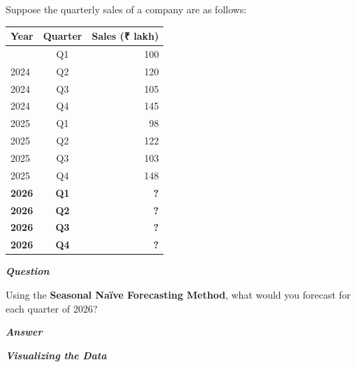 \documentclass[
  a4paper,
]{article}
\newcounter{none} %
\begin{document}
Suppose the quarterly sales of a company are as follows:

{\def\LTcaptype{none} %
\begin{longtable}[]{@{}lcr@{}}
\toprule\noalign{}
Year & Quarter & Sales (₹ lakh) \\
\midrule\noalign{}
\endhead
\bottomrule\noalign{}
\endlastfoot
2024 & Q1 & 100 \\
2024 & Q2 & 120 \\
2024 & Q3 & 105 \\
2024 & Q4 & 145 \\
2025 & Q1 & 98 \\
2025 & Q2 & 122 \\
2025 & Q3 & 103 \\
2025 & Q4 & 148 \\
\textbf{2026} & \textbf{Q1} & \textbf{?} \\
\textbf{2026} & \textbf{Q2} & \textbf{?} \\
\textbf{2026} & \textbf{Q3} & \textbf{?} \\
\textbf{2026} & \textbf{Q4} & \textbf{?} \\
\end{longtable}
}

\textbf{\emph{Question}}

Using the \textbf{Seasonal Naïve Forecasting Method}, what would you
forecast for each quarter of 2026?

\textbf{\emph{Answer}}

\textbf{\emph{Visualizing the Data}}
\end{document}
